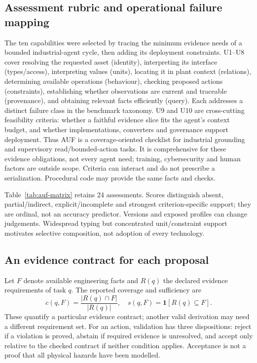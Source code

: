 
\subsection{Assessment rubric and operational failure mapping}
The ten capabilities were selected by tracing the minimum evidence needs of a
bounded industrial-agent cycle, then adding its deployment constraints. U1--U8
cover resolving the requested asset (identity), interpreting its interface
(types/access), interpreting values (units), locating it in plant context
(relations), determining available operations (behaviour), checking proposed
actions (constraints), establishing whether observations are current and
traceable (provenance), and obtaining relevant facts efficiently (query). Each
addresses a distinct failure class in the benchmark taxonomy. U9 and U10 are
cross-cutting feasibility criteria: whether a faithful evidence slice fits the
agent's context budget, and whether implementations, converters and governance
support deployment. Thus AUF is a coverage-oriented checklist for industrial
grounding and supervisory read/bounded-action tasks. It is comprehensive for
these evidence obligations, not every agent need; training, cybersecurity and
human factors are outside scope. Criteria can interact and do not prescribe a
serialization. Procedural code may provide the same facts and checks.

Table~\ref{tab:auf-matrix} retains 24 assessments. Scores distinguish absent,
partial/indirect, explicit/incomplete and strongest criterion-specific support;
they are ordinal, not an accuracy predictor. Versions and exposed profiles can
change judgements. Widespread typing but concentrated unit/constraint support
motivates selective composition, not adoption of every technology.

\subsection{An evidence contract for each proposal}
Let $F$ denote available engineering facts and $R(q)$ the declared evidence
requirements of task $q$. The reported coverage and sufficiency are
\begin{equation}
 c(q,F)=\frac{|R(q)\cap F|}{|R(q)|},\quad
 s(q,F)=\mathbf{1}[R(q)\subseteq F].
\end{equation}
These quantify a particular evidence contract; another valid derivation may
need a different requirement set. For an action, validation has three dispositions:
reject if a violation is proved, abstain if required evidence is unresolved, and
accept only relative to the checked contract if neither condition applies.
Acceptance is not a proof that all physical hazards have been modelled.

